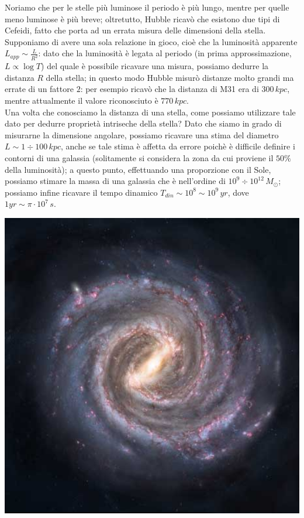 Noriamo che per le stelle più luminose il periodo è più lungo, mentre per quelle meno luminose è più breve; oltretutto, Hubble ricavò che esistono due tipi di Cefeidi, fatto che porta ad un errata misura delle dimensioni della stella. Supponiamo di avere una sola relazione in gioco, cioè che la luminosità apparente $L_ {app} \sim \frac{L}{R^2}$: dato che la luminosità è legata al periodo (in prima approssimazione, $L \propto \log T$) del quale è possibile ricavare una misura, possiamo dedurre la distanza $R$ della stella; in questo modo Hubble misurò distanze molto grandi ma errate di un fattore $2$: per esempio ricavò che la distanza di M31 era di $300 \, kpc$, mentre attualmente il valore riconosciuto è $770 \, kpc$.
\\
Una volta che conosciamo la distanza di una stella, come possiamo utilizzare tale dato per dedurre proprietà intriseche della stella? Dato che siamo in grado di misurarne la dimensione angolare, possiamo ricavare una stima del diametro $L \sim 1 \div 100 \, kpc$, anche se tale stima è affetta da errore poichè è difficile definire i contorni di una galassia (solitamente si considera la zona da cui proviene il $50 \%$ della luminosità); a questo punto, effettuando una proporzione con il Sole, possiamo stimare la massa di una galassia che è nell'ordine di $10^9 \div 10^{12} \, M_{\odot}$; possiamo infine ricavare il tempo dinamico $T_{din} \sim 10^8 \sim 10^9 \, yr$, dove $1 yr \sim \pi \cdot 10^7 \, s$.
\\
\begin{minipage}{.35\textwidth}
\centering
\includegraphics[width=1\textwidth]{Img/via_lattea.jpg}
\end{minipage}
